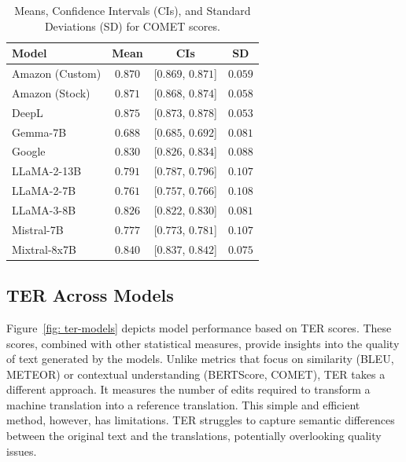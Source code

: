 \begin{table}[htb]
\centering
\begin{tabular}{lccc}
\toprule
\textbf{Model} & \textbf{Mean} & \textbf{CIs} & \textbf{SD} \\
\midrule
Amazon (Custom) & $0.870$ & [$0.869$, $0.871$] & $0.059$ \\
Amazon (Stock) & $0.871$ & [$0.868$, $0.874$] & $0.058$ \\
DeepL & $\mathbf{0.875}$ & [$0.873$, $0.878$] & $0.053$ \\
Gemma-7B & $0.688$ & [$0.685$, $0.692$] & $0.081$ \\
Google & $0.830$ & [$0.826$, $0.834$] & $0.088$ \\
LLaMA-2-13B & $0.791$ & [$0.787$, $0.796$] & $0.107$ \\
LLaMA-2-7B & $0.761$ & [$0.757$, $0.766$] & $0.108$ \\
LLaMA-3-8B & $0.826$ & [$0.822$, $0.830$] & $0.081$ \\
Mistral-7B & $0.777$ & [$0.773$, $0.781$] & $0.107$ \\
Mixtral-8x7B & $0.840$ & [$0.837$, $0.842$] & $0.075$ \\
\bottomrule
\end{tabular}
\caption{Means, Confidence Intervals (CIs), and Standard Deviations (SD) for COMET scores.}
\label{tab:mean_ci_scores_comet}
\end{table}


\subsection{TER Across Models}

Figure~\ref{fig: ter-models} depicts model performance based on TER scores. These scores, combined with other statistical measures, provide insights into the quality of text generated by the models. Unlike metrics that focus on similarity (BLEU, METEOR) or contextual understanding (BERTScore, COMET), TER takes a different approach. It measures the number of edits required to transform a machine translation into a reference translation. This simple and efficient method, however, has limitations. TER struggles to capture semantic differences between the original text and the translations, potentially overlooking quality issues.

